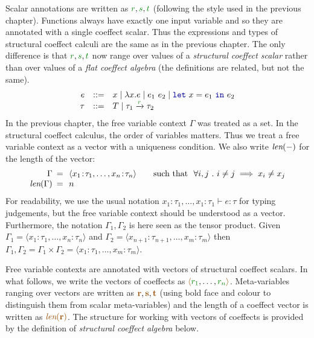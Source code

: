 Scalar annotations are written as $\cclrd{r}, \cclrd{s}, \cclrd{t}$ (following the style used in 
the previous chapter). Functions always have exactly one input variable and so they are annotated
with a single coeffect scalar. Thus the expressions and types of structural coeffect calculi are the 
same as in the previous chapter. The only difference is that $\cclrd{r}, \cclrd{s}, \cclrd{t}$ now
range over values of a \emph{structural coeffect scalar} rather than over values of a \emph{flat 
coeffect algebra} (the definitions are related, but not the same).
%
\begin{equation*}
\begin{array}{rcl}
e &::=& x \sep \lambda x.e \sep e_1~e_2 \sep \kvd{let}~x = e_1~\kvd{in}~e_2\\
\tau &::=& T \sep \tau_1 \xrightarrow{\cclrd{r}} \tau_2
\end{array}
\end{equation*}
%
In the previous chapter, the free variable context $\Gamma$ was treated as a set. In the 
structural coeffect calculus, the order of variables matters. Thus we treat a free variable 
context as a vector with a uniqueness condition. We also write ${\textit{len}(-)}$ for the length
of the vector:
%
\begin{equation*}
\begin{array}{rcl}
 \Gamma &\narrow{=}& \langle x_1\!:\!\tau_1, \ldots, x_n\!:\!\tau_n \rangle \qquad \textnormal{such that}~~\forall i, j ~.~ i \neq j \implies x_i \neq x_j\\
 \xlen{\Gamma} &\narrow{=}& n
\end{array}
\end{equation*}
%
For readability, we use the usual notation $x_1\!:\!\tau_1, \ldots, x_1\!:\!\tau_1 \vdash e : \tau$ for
typing judgements, but the free variable context should be understood as a vector.
Furthermore, the notation $\Gamma_1, \Gamma_2$ is here seen as the tensor product.
Given $\Gamma_1 = \langle x_1\!:\!\tau_1, \ldots, x_n\!:\!\tau_n \rangle $ and
$\Gamma_2 = \langle x_{n+1}\!:\!\tau_{n+1}, \ldots, x_m\!:\!\tau_m \rangle $ then
$\Gamma_1, \Gamma_2 = \Gamma_1 \times \Gamma_2 = \langle x_1\!:\!\tau_1, \ldots, x_m\!:\!\tau_m \rangle$.

Free variable contexts are annotated with vectors of structural coeffect scalars. In what follows,
we write the vectors of coeffects as $\alift{\cclrd{r_1}, \ldots, \cclrd{r_n}}$. Meta-variables ranging 
over vectors are written as $\aclrd{\textbf{r}}, \aclrd{\textbf{s}}, \aclrd{\textbf{t}}$ (using bold face 
and colour to distinguish them from scalar meta-variables) and the length of a coeffect vector
is written as $\alen{\aclrd{\textbf{r}}}$. The structure for working with vectors
of coeffects is provided by the definition of \emph{structural coeffect algebra} below. 

